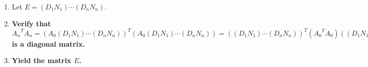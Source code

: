\documentclass[twocolumn]{article}
\begin{document}
\begin{enumerate}
\begin{enumerate}
					\item Using \hyperref[sec:algorithm 8]{algorithm 8}, verify that $C_n(N_i)=1\ne 0$.
					\item Let $A_i=A_{i-1}D_iN_i$.
					\item \textbf{Verify that $C_n(A_i)=C_n(A_{i-1}D_iN_i)=C_n(A_{i-1})C_n(D_i)C_n(N_i)=C_n(A_{i-1})C_n(D_i)\ne 0$}.
					\item Verify that ${A_{i-1}}^TA_i=({A_{i-1}}^TA_{i-1})D_iN_i$ is a matrix with $0$s from position $(i,i+1)$ to $(i,n)$.
					\item \textbf{Verify that ${A_i}^TA_i=(A_{i-1}D_iN_i)^T(A_{i-1}D_iN_i)={N_i}^T{D_i}^T({A_{i-1}}^TA_{i-1})D_iN_i$ is a matrix with $0$s from position $(i,i+1)$ to $(i,n)$ and from position $(i+1,i)$ to $(n,i)$.}
					\item Verify that $A_i=A_0(D_1N_1)\cdots (D_iN_i)$.
					\item Verify that $MA_i=(D_1N_1)\cdots (D_iN_i)$.
					\item For $j=1$ to $j=n$, do the following:
					\begin{enumerate}
						\item Using \hyperref[sec:algorithm 48]{algorithm 48}, verify that $({e_j}^TM)(A_ie_j)={e_j}^T(MA_i)e_j={e_j}^T((D_1N_1)\cdots (D_iN_i))e_j=({D_1}_{j,j}{N_1}_{j,j})\cdots ({D_i}_{j,j}{N_i}_{j,j})$.
						\item \textbf{Therefore using (5d) verify that $({e_j}^TM)(A_ie_j)={D_1}_{j,j}\cdots {D_i}_{j,j}={D_1}_{j,j}\cdots {D_{\min(i,j-1)}}_{j,j}=\lVert A_0e_1\rVert^2\cdots\lVert A_{\min(i,j-1)-1}e_{\min(i,j-1)}\rVert^2$.}
					\end{enumerate}
				\end{enumerate}
				\item Let $E=(D_1N_1)\cdots (D_nN_n)$.
				\item \textbf{Verify that ${A_n}^TA_n=(A_0(D_1N_1)\cdots (D_nN_n))^T(A_0(D_1N_1)\cdots (D_nN_n))=((D_1N_1)\cdots (D_nN_n))^T({A_0}^TA_0)((D_1N_1)\cdots (D_nN_n))=E^T({A_0}^TA_0)E$ is a diagonal matrix.}
				\item \textbf{Yield the matrix $E$.}
			\end{enumerate}
\end{document}
